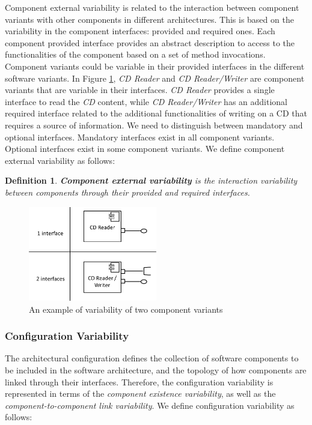 \documentclass[graybox]{svmult}
\newtheorem{mydef}{Definition}
\begin{document}


Component external variability is related to the interaction between component variants with other components in different architectures. This is based on the variability in the component interfaces: provided and required ones. 
Each component provided interface provides an abstract description to access to the functionalities of the component based on a set of method invocations. Component variants could be variable in their provided interfaces in the different software variants. In Figure \ref{fig:interVarEx}, \textit{CD Reader} and \textit{CD Reader/Writer} are component variants that are variable in their interfaces. \textit{CD Reader} provides a single interface to read the \textit{CD} content, while \textit{CD Reader/Writer} has an additional required interface related to the additional functionalities of writing on a CD that requires a source of information. We need to distinguish between mandatory and optional interfaces. Mandatory interfaces exist in all component variants. Optional interfaces exist in some component variants. We define component external variability as follows:

\begin{mydef}
\textbf{Component external variability} is the interaction variability between components through their provided and required interfaces.
\end{mydef}


\begin{figure}[h]
\centering
\includegraphics[width=0.5\textwidth]{figs/interfaceVarExample.png}
\caption{An example of variability of two component variants}
\label{fig:interVarEx}
\end{figure}


\subsubsection{Configuration Variability} 
The architectural configuration defines the collection of software components to be included in the software architecture, and the topology of how components are linked through their interfaces. Therefore, the configuration variability is represented in terms of the \textit{component existence variability}, as well as the \textit{component-to-component link variability}. We define configuration variability as follows:
\end{document}
